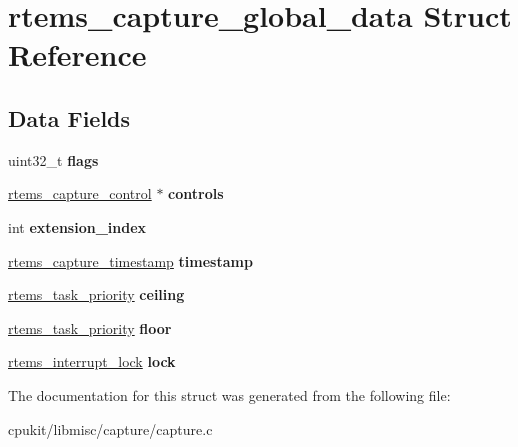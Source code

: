 \hypertarget{structrtems__capture__global__data}{}\section{rtems\+\_\+capture\+\_\+global\+\_\+data Struct Reference}
\label{structrtems__capture__global__data}
\subsection*{Data Fields}
\begin{DoxyCompactItemize}
\item 
\mbox{\label{structrtems__capture__global__data_a9fb0b45eac2f78e2cec8171d48ac55ca}} 
uint32\+\_\+t {\bfseries flags}
\item 
\mbox{\label{structrtems__capture__global__data_a28a67c47b5a102d8f85e7597c9cddc30}} 
\mbox{\hyperlink{structrtems__capture__control}{rtems\+\_\+capture\+\_\+control}} $\ast$ {\bfseries controls}
\item 
\mbox{\label{structrtems__capture__global__data_a57a3ea18dad892ccbf127085ea8a7839}} 
int {\bfseries extension\+\_\+index}
\item 
\mbox{\label{structrtems__capture__global__data_a6bd1a2a75788324c66fddc91aedae94a}} 
\mbox{\hyperlink{group__libmisc__capture_gab70845b819ef4c8c57f4f46ce276f0dd}{rtems\+\_\+capture\+\_\+timestamp}} {\bfseries timestamp}
\item 
\mbox{\label{structrtems__capture__global__data_a8c0e29f88cc98e0815c62d6c97d0e2ca}} 
\mbox{\hyperlink{group__ClassicTasks_gaa80a0c0938307d1e99d0eb5fee765b47}{rtems\+\_\+task\+\_\+priority}} {\bfseries ceiling}
\item 
\mbox{\label{structrtems__capture__global__data_ab10c414d9a8f5232f916db9531b3a25d}} 
\mbox{\hyperlink{group__ClassicTasks_gaa80a0c0938307d1e99d0eb5fee765b47}{rtems\+\_\+task\+\_\+priority}} {\bfseries floor}
\item 
\mbox{\label{structrtems__capture__global__data_ad101bb2afb19da1ac455ad135844c3af}} 
\mbox{\hyperlink{group__ClassicINTRLocks_ga7d4b54b01fd1507aa842d5fbc7b11177}{rtems\+\_\+interrupt\+\_\+lock}} {\bfseries lock}
\end{DoxyCompactItemize}


The documentation for this struct was generated from the following file\+:\begin{DoxyCompactItemize}
\item 
cpukit/libmisc/capture/capture.\+c\end{DoxyCompactItemize}
